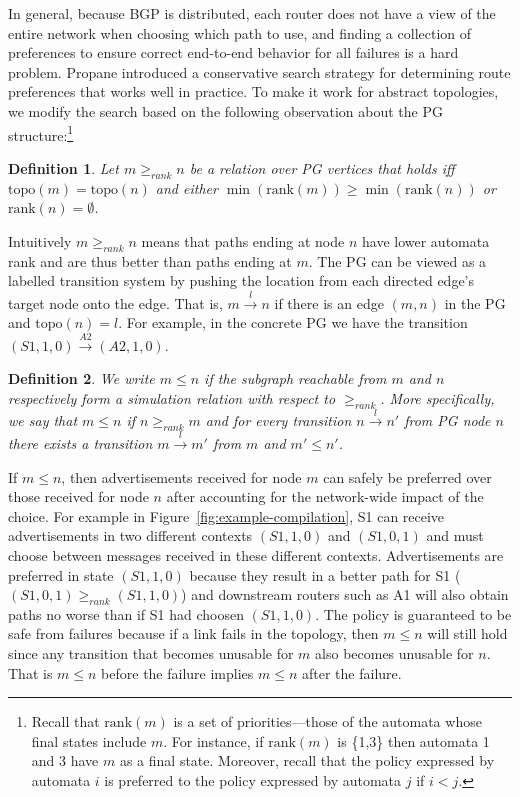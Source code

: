 \documentclass[numbers, 10pt, preprint]{sigplanconf}
\newcommand{\Propane}{{\text{}\small \sf Propane}\xspace}
\newcommand{\Topo}[1]{\ensuremath{{\mathrm{topo}}(#1)}}
\newcommand{\Pref}{\ensuremath{\mathrm{rank}}}
\newtheorem{defn}{Definition}[section]
\begin{document}
In general, because BGP is distributed, each router does not have a view of the entire network when choosing which path to use, and finding a collection of preferences to ensure correct end-to-end behavior for all failures is a hard problem. \Propane introduced a conservative search strategy for determining route preferences that works well in practice. To make it work for abstract topologies, we modify the search based on the following observation about the PG structure:\footnote{Recall that $\Pref(m)$ is a set of priorities---those of the
automata whose final states include $m$.  
For instance, if $\Pref(m)$ is \{1,3\} then
automata 1 and 3 have $m$ as a final state.  Moreover, recall that
the policy expressed by automata $i$ is preferred to the policy expressed
by automata $j$ if $i < j$.}

\begin{defn}
Let $m \geq_{rank} n$ be a relation over PG vertices that holds iff $\Topo{m} = \Topo{n}$ and either $\min (\Pref(m)) \geq \min (\Pref(n))$ or $\Pref(n) = \emptyset$.
%
\end{defn}
\noindent
%
Intuitively $m \geq_{rank} n$ means that paths ending at node $n$ have lower automata rank and are thus better than paths ending at $m$.
The PG can be viewed as a labelled transition system by pushing the location from each directed edge's target node onto the edge. That is, $m\overset{l}{\rightarrow}n$ if there is an edge $(m,n)$ in the PG and $\Topo{n} = l$.
%
For example, in the concrete PG we have the transition $(S1,1,0)\overset{A2}{\rightarrow}(A2,1,0)$.

\begin{defn}
We write $m \leq n$ if the subgraph reachable from $m$ and $n$ respectively form a simulation relation with respect to $\geq_{rank}$. More specifically, we say that $m \leq n$ if $n \geq_{rank} m$ and for every transition $n\overset{l}{\rightarrow}n'$ from PG node $n$ there exists a transition $m\overset{l}{\rightarrow}m'$ from $m$ and $m' \leq n'$.
\end{defn}


If $m \leq n$, then advertisements received for node $m$ can safely be preferred over those received for node $n$ after accounting for the network-wide impact of the choice. For example in Figure~\ref{fig:example-compilation}, S1 can receive advertisements in two different contexts $(S1,1,0)$ and $(S1,0,1)$ and must choose between messages received in these different contexts. Advertisements are preferred in state $(S1,1,0)$ because they result in a better path for S1 ($(S1,0,1) \geq_{rank} (S1,1,0)$) and downstream routers such as A1 will also obtain paths no worse than if S1 had choosen $(S1,1,0)$. The policy is guaranteed to be safe from failures because if a link fails in the topology, then $m \leq n$ will still hold since any transition that becomes unusable for $m$ also becomes unusable for $n$. That is $m \leq n$ before the failure implies $m \leq n$ after the failure.
\end{document}

